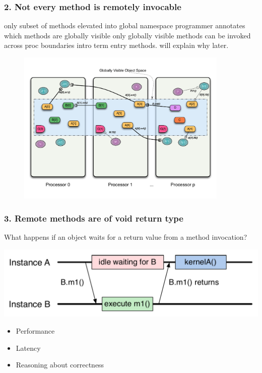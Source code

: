 \begin{frame}
\frametitle{2. Not every method is remotely invocable}
only subset of methods elevated into global namespace
programmer annotates which methods are globally visible
only globally visible methods can be invoked across proc boundaries
intro term entry methods. will explain why later.
  \begin{figure}\includegraphics[width=0.9\textwidth]{../figures/progmodel/11-global-methods.pdf}\end{figure}
\end{frame}


\begin{frame}
\frametitle{3. Remote methods are of void return type}
  What happens if an object waits for a return value from a method invocation?
  \pause
  \begin{center}
    \includegraphics[width=\textwidth]{../figures/objectSequence.pdf}
  \end{center}
  \pause
  \begin{itemize}
    \item Performance
    \item Latency
    \item Reasoning about correctness
  \end{itemize}
\end{frame}


